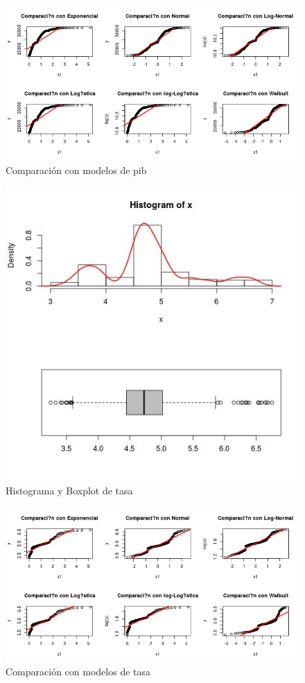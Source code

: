 \documentclass{article}
\begin{document}
\begin{figure}[h!]
\centering
\includegraphics[scale=0.5]{./plots/cm_pib.png}
\caption{Comparación con modelos de pib}
\end{figure}
\pagebreak
\begin{figure}[h!]
\centering
\includegraphics[scale=0.5]{./plots/histplot_tasa.png}
\caption{Histograma y Boxplot de tasa}
\end{figure}

\begin{figure}[h!]
\centering
\includegraphics[scale=0.5]{./plots/cm_tasa.png}
\caption{Comparación con modelos de tasa}
\end{figure}
\end{document}
